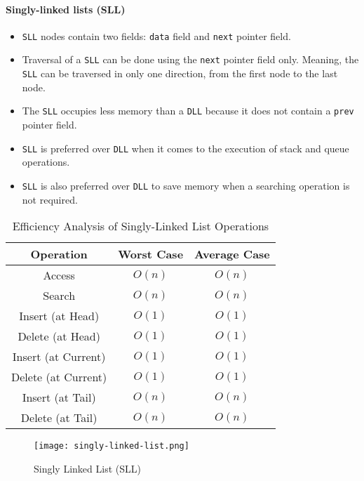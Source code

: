 \paragraph{Singly-linked lists (SLL)}
\label{par:singly-linked-list}
\begin{itemize}
    \item \lstinline{SLL} nodes contain two fields: \lstinline{data} field and \lstinline{next} pointer field.
    \item Traversal of a \lstinline{SLL} can be done using the \lstinline{next} pointer field only. Meaning, the \lstinline{SLL} can be traversed in only one direction, from the first node to the last node.
    \item The \lstinline{SLL} occupies less memory than a \lstinline{DLL} because it does not contain a \lstinline{prev} pointer field.
    \item \lstinline{SLL} is preferred over \lstinline{DLL} when it comes to the execution of stack and queue operations.
    \item \lstinline{SLL} is also preferred over \lstinline{DLL} to save memory when a searching operation is not required.
\end{itemize}
\begin{table}[h]
    \centering
    \caption{Efficiency Analysis of Singly-Linked List Operations}
    \label{tab:singly-linked-list-efficiency-analysis}
    \begin{tabular}{|c|c|c|}
        \hline
        Operation           & Worst Case & Average Case \\ \hline
        Access              & $O(n)$     & $O(n)$       \\ \hline
        Search              & $O(n)$     & $O(n)$       \\ \hline
        Insert (at Head)    & $O(1)$     & $O(1)$       \\ \hline
        Delete (at Head)    & $O(1)$     & $O(1)$       \\ \hline
        Insert (at Current) & $O(1)$     & $O(1)$       \\ \hline
        Delete (at Current) & $O(1)$     & $O(1)$       \\ \hline
        Insert (at Tail)    & $O(n)$     & $O(n)$       \\ \hline
        Delete (at Tail)    & $O(n)$     & $O(n)$       \\ \hline
    \end{tabular}
\end{table}
\begin{figure}[htbp]
    \centering
    \texttt{[image: singly-linked-list.png]}
    \caption{Singly Linked List (SLL) \cite{vaghani_2023}}
    \label{fig:singly-linked-list}
\end{figure}
\hfill\medskip\\

